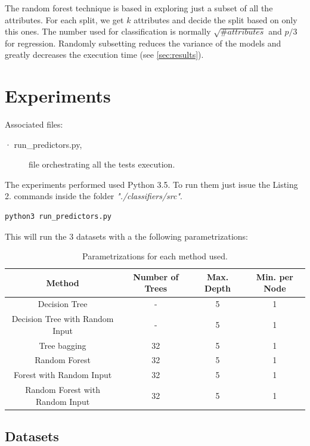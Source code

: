 \documentclass[a4paper,10pt]{article}
\begin{document}
The random forest technique is based in exploring just a subset of all the attributes. For each split, we get $k$ attributes and decide the split based on only this ones. The number used for classification is normally $\sqrt{\# attributes}$ and $p/3$ for regression. Randomly subsetting reduces the variance of the models and greatly decreases the execution time (see \ref{sec:results}).


\section{Experiments}
\label{sec:experiments}

Associated files:
\begin{description}
 \item [· run\_predictors.py,] file orchestrating all the tests execution.
\end{description}

The experiments performed used Python 3.5. To run them just issue the Listing 2. commands inside the folder \textit{"./classifiers/src"}.

\begin{lstlisting}[language=bash,caption={Execution commands to reproduce reported results}]
python3 run_predictors.py
\end{lstlisting}

This will run the 3 datasets with a the following parametrizations: 

\begin{table}[h]
    \centering
    \begin{tabular}{|c|c|c|c|}
        \hline
        \textbf{Method}   & \textbf{Number of Trees}     & \textbf{Max. Depth} & \textbf{Min. per Node} \\ \hline
	  Decision Tree & - & 5 & 1 \\ \hline
	  Decision Tree with Random Input & - & 5 & 1 \\ \hline
	  Tree bagging & 32 & 5 & 1 \\ \hline
	  Random Forest & 32 & 5 & 1 \\ \hline
	  Forest with Random Input & 32 & 5 & 1 \\ \hline
	  Random Forest with Random Input & 32 & 5 & 1 \\ \hline
    \end{tabular}	
    \caption{Parametrizations for each method used.}
\end{table}



\subsection{Datasets}
\label{subsec:datasets}
\end{document}
